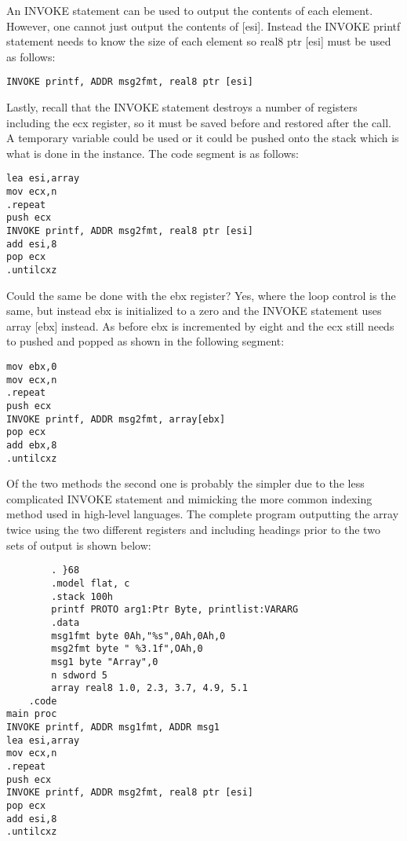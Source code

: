 \documentclass[10pt]{article}
\begin{document}
An INVOKE statement can be used to output the contents of each element. However, one cannot just output the contents of [esi]. Instead the INVOKE printf statement needs to know the size of each element so real8 ptr [esi] must be used as follows:

\begin{verbatim}
INVOKE printf, ADDR msg2fmt, real8 ptr [esi]
\end{verbatim}

Lastly, recall that the INVOKE statement destroys a number of registers including the ecx register, so it must be saved before and restored after the call. A temporary variable could be used or it could be pushed onto the stack which is what is done in the instance. The code segment is as follows:

\begin{verbatim}
lea esi,array
mov ecx,n
.repeat
push ecx
INVOKE printf, ADDR msg2fmt, real8 ptr [esi]
add esi,8
pop ecx
.untilcxz
\end{verbatim}

Could the same be done with the ebx register? Yes, where the loop control is the same, but instead ebx is initialized to a zero and the INVOKE statement uses array [ebx] instead. As before ebx is incremented by eight and the ecx still needs to pushed and popped as shown in the following segment:

\begin{verbatim}
mov ebx,0
mov ecx,n
.repeat
push ecx
INVOKE printf, ADDR msg2fmt, array[ebx]
pop ecx
add ebx,8
.untilcxz
\end{verbatim}

Of the two methods the second one is probably the simpler due to the less complicated INVOKE statement and mimicking the more common indexing method used in high-level languages. The complete program outputting the array twice using the two different registers and including headings prior to the two sets of output is shown below:

\begin{verbatim}
        . }68
        .model flat, c
        .stack 100h
        printf PROTO arg1:Ptr Byte, printlist:VARARG
        .data
        msg1fmt byte 0Ah,"%s",0Ah,0Ah,0
        msg2fmt byte " %3.1f",OAh,0
        msg1 byte "Array",0
        n sdword 5
        array real8 1.0, 2.3, 3.7, 4.9, 5.1
    .code
main proc
INVOKE printf, ADDR msg1fmt, ADDR msg1
lea esi,array
mov ecx,n
.repeat
push ecx
INVOKE printf, ADDR msg2fmt, real8 ptr [esi]
pop ecx
add esi,8
.untilcxz
\end{verbatim}
\end{document}
